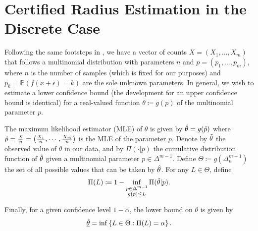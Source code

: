 \section{Certified Radius Estimation in the Discrete Case}\label{sec:discrete}
Following the same footsteps in , we have a vector of counts $X = (X_1, \ldots, X_m)$ that follows a multinomial distribution with parameters $n$ and $p = (p_1, \ldots, p_m)$, where $n$ is the number of samples (which is fixed for our purposes) and $p_k = \mathbb{P}(f(x + \epsilon) = k)$ are the sole unknown parameters.
In general, we wish to estimate a lower confidence bound (the development for an upper confidence bound is identical) for a real-valued function $\theta\coloneqq g(p)$ of the multinomial parameter $p$.

The maximum likelihood estimator (MLE) of $\theta$ is given by $\Hat{\theta}=g(\Hat{p})$ where $\Hat{p} = \frac{X}{n}=\left(\frac{X_1}{n}, \cdots, \frac{X_m}{n}\right)$ is the MLE of the parameter $p$.
Denote by $\Tilde{\theta}$ the observed value of $\theta$ in our data, and by $\Pi(\cdot|p)$ the cumulative distribution function of $\Hat{\theta}$ given a multinomial parameter $p\in\Delta^{m-1}$.
Define $\Theta\coloneqq g(\Delta^{m-1}_n)$ the set of all possible values that can be taken by $\Hat{\theta}$. For any $L\in\Theta$, define
\[
    \Pi(L)\coloneqq1-\inf_{\substack{p\in\Delta^{m-1}\\g(p)\leq L}}\Pi(\Tilde{\theta}|p).
\]

Finally, for a given confidence level $1-\alpha$, the lower bound on $\theta$ is given by
\[
    \underline{\Hat{\theta}} = \inf\left\{ L\in\Theta : \Pi(L) = \alpha \right\}.
\]